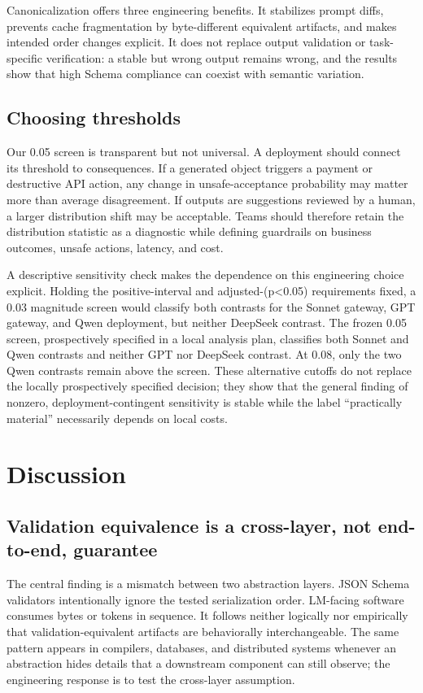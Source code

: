 \documentclass[11pt,a4paper]{article}
\begin{document}
Canonicalization offers three engineering benefits. It stabilizes prompt diffs, prevents cache fragmentation by byte-different equivalent artifacts, and makes intended order changes explicit. It does not replace output validation or task-specific verification: a stable but wrong output remains wrong, and the results show that high Schema compliance can coexist with semantic variation.

\subsection{Choosing thresholds}
Our 0.05 screen is transparent but not universal. A deployment should connect its threshold to consequences. If a generated object triggers a payment or destructive API action, any change in unsafe-acceptance probability may matter more than average disagreement. If outputs are suggestions reviewed by a human, a larger distribution shift may be acceptable. Teams should therefore retain the distribution statistic as a diagnostic while defining guardrails on business outcomes, unsafe actions, latency, and cost.

A descriptive sensitivity check makes the dependence on this engineering choice explicit. Holding the positive-interval and adjusted-(p<0.05) requirements fixed, a 0.03 magnitude screen would classify both contrasts for the Sonnet gateway, GPT gateway, and Qwen deployment, but neither DeepSeek contrast. The frozen 0.05 screen, prospectively specified in a local analysis plan, classifies both Sonnet and Qwen contrasts and neither GPT nor DeepSeek contrast. At 0.08, only the two Qwen contrasts remain above the screen. These alternative cutoffs do not replace the locally prospectively specified decision; they show that the general finding of nonzero, deployment-contingent sensitivity is stable while the label ``practically material'' necessarily depends on local costs.

\section{Discussion}
\subsection{Validation equivalence is a cross-layer, not end-to-end, guarantee}
The central finding is a mismatch between two abstraction layers. JSON Schema validators intentionally ignore the tested serialization order. LM-facing software consumes bytes or tokens in sequence. It follows neither logically nor empirically that validation-equivalent artifacts are behaviorally interchangeable. The same pattern appears in compilers, databases, and distributed systems whenever an abstraction hides details that a downstream component can still observe; the engineering response is to test the cross-layer assumption.
\end{document}

